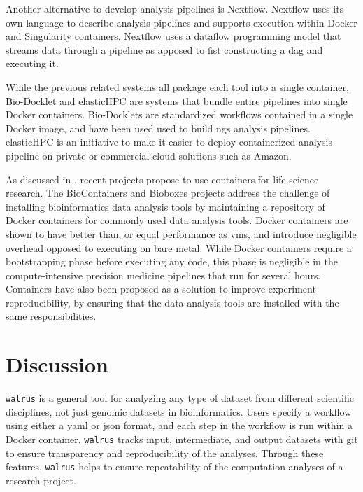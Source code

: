 Another alternative to develop analysis pipelines is
Nextflow.\cite{di2017nextflow} Nextflow uses its own language to describe
analysis pipelines and supports execution within Docker and Singularity
containers. Nextflow uses a dataflow programming model that streams data
through a pipeline as apposed to fist constructing a \gls{dag} and executing it.

While the previous related systems all package each tool into a single
container, Bio-Docklet and elasticHPC are systems that bundle entire
pipelines into single Docker containers. Bio-Docklets are standardized
workflows contained in a single Docker image, and have been used used to build
\gls{ngs} analysis pipelines.\cite{biodocklets} elasticHPC is an initiative to
make it easier to deploy containerized analysis pipeline on private or
commercial cloud solutions such as Amazon.\cite{ali2016case} 

As discussed in \cite{NIK, fjukstad2017review}, recent projects propose to use
containers for life science research. The BioContainers and
Bioboxes\cite{belmann2015bioboxes} projects address the challenge of installing
bioinformatics data analysis tools by maintaining a repository of Docker
containers for commonly used data analysis tools. Docker containers are shown to
have better than, or equal performance as \glspl{vm}, and introduce negligible
overhead opposed to executing on bare metal.\cite{di2015impact} 
While Docker containers require a bootstrapping phase before executing any code,
this phase is negligible in the compute-intensive precision medicine pipelines
that run for several hours. Containers have also been proposed as a solution
to improve experiment reproducibility, by ensuring that the data analysis tools
are installed with the same responsibilities.\cite{boettiger2015introduction} 


\section{Discussion}
\texttt{walrus} is a general tool for analyzing any type of dataset from
different scientific disciplines, not just genomic datasets in bioinformatics.
Users specify a workflow using either a \gls{yaml} or \gls{json} format, and
each step in the workflow is run within a Docker container. \texttt{walrus}
tracks input, intermediate, and output datasets with git to ensure transparency
and reproducibility of the analyses. Through these features, \texttt{walrus}
helps to ensure repeatability of the computation analyses of a research project.

